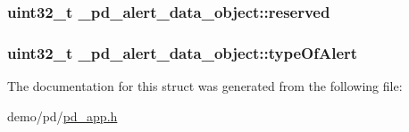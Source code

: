 \hypertarget{struct__pd__alert__data__object_a23d29e1d570b84c87f3ff7832fc282f4}{
\subsubsection[{reserved}]{\setlength{\rightskip}{0pt plus 5cm}uint32\-\_\-t \-\_\-pd\-\_\-alert\-\_\-data\-\_\-object\-::reserved}}\label{struct__pd__alert__data__object_a23d29e1d570b84c87f3ff7832fc282f4}
\hypertarget{struct__pd__alert__data__object_ad73d27b0e318aafc2aeb84ab5eb487b2}{
\subsubsection[{type\-Of\-Alert}]{\setlength{\rightskip}{0pt plus 5cm}uint32\-\_\-t \-\_\-pd\-\_\-alert\-\_\-data\-\_\-object\-::type\-Of\-Alert}}\label{struct__pd__alert__data__object_ad73d27b0e318aafc2aeb84ab5eb487b2}


The documentation for this struct was generated from the following file\-:\begin{DoxyCompactItemize}
\item 
demo/pd/\hyperlink{pd__app_8h}{pd\-\_\-app.\-h}\end{DoxyCompactItemize}
